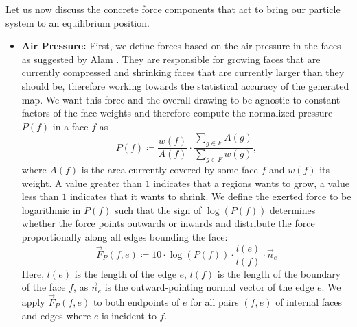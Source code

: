 Let us now discuss the concrete force components that act to bring our particle system to an equilibrium position.
%
\begin{itemize}
\item \textbf{Air Pressure:}
First, we define forces based on the air pressure in the faces as suggested by Alam \etal{} \cite{alam2013computing}.
They are responsible for growing faces that are currently compressed and shrinking faces that are currently larger than they should be, therefore working towards the statistical accuracy of the generated map.
We want this force and the overall drawing to be agnostic to constant factors of the face weights and therefore compute the normalized pressure $P(f)$ in a face $f$ as
\begin{equation*}
	P(f) \coloneqq \frac{w(f)}{A(f)} \cdot \frac{\sum\limits_{g \in F}{A(g)}}{\sum\limits_{g \in F}{w(g)}},
\end{equation*}
where $A(f)$ is the area currently covered by some face $f$ and $w(f)$ its weight.
A value greater than $1$ indicates that a regions wants to grow, a value less than $1$ indicates that it wants to shrink.
We define the exerted force to be logarithmic in $P(f)$ such that the sign of $\log(P(f))$ determines whether the force points outwards or inwards and distribute the force proportionally along all edges bounding the face:
\begin{equation}
	\vec{F}_P(f,e) \coloneqq 10 \cdot \log(P(f)) \cdot \frac{l(e)}{l(f)} \cdot \vec{n}_e
\end{equation}
Here, $l(e)$ is the length of the edge $e$, $l(f)$ is the length of the boundary of the face $f$, as $\vec{n}_e$ is the outward-pointing normal vector of the edge $e$.
We apply $\vec{F}_P(f,e)$ to both endpoints of $e$ for all pairs $(f,e)$ of internal faces and edges where $e$ is incident to $f$.


\end{itemize}
